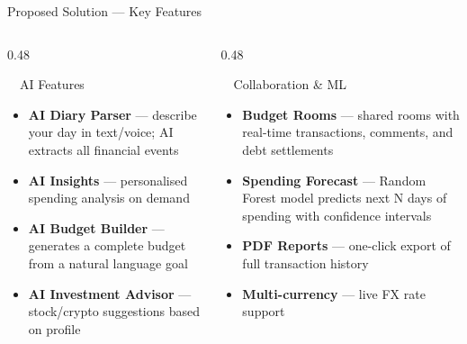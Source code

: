 \documentclass[aspectratio=169, 11pt]{beamer}
\begin{document}
\begin{frame}{Proposed Solution — Key Features}
  \begin{columns}[T]
    \begin{column}{0.48\textwidth}
      \begin{block}{\faRobot\ \ AI Features}
        \begin{itemize}
          \item \textbf{AI Diary Parser} — describe your day in text/voice; AI extracts all financial events
          \item \textbf{AI Insights} — personalised spending analysis on demand
          \item \textbf{AI Budget Builder} — generates a complete budget from a natural language goal
          \item \textbf{AI Investment Advisor} — stock/crypto suggestions based on profile
        \end{itemize}
      \end{block}
    \end{column}
    \begin{column}{0.48\textwidth}
      \begin{block}{\faUsers\ \ Collaboration \& ML}
        \begin{itemize}
          \item \textbf{Budget Rooms} — shared rooms with real-time transactions, comments, and debt settlements
          \item \textbf{Spending Forecast} — Random Forest model predicts next N days of spending with confidence intervals
          \item \textbf{PDF Reports} — one-click export of full transaction history
          \item \textbf{Multi-currency} — live FX rate support
        \end{itemize}
      \end{block}
    \end{column}
  \end{columns}
\end{frame}

\end{document}
